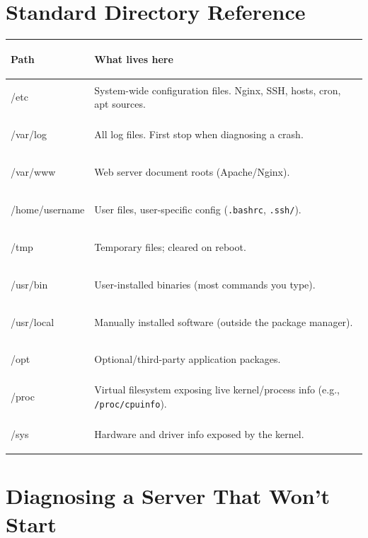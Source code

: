 \documentclass[11pt, letterpaper]{article}
\begin{document}
\section*{Standard Directory Reference}

\noindent
{\renewcommand{\arraystretch}{1.5}
\begin{tabularx}{\textwidth}{>{\ttfamily\bfseries\raggedright\arraybackslash}p{3.5cm}
                              >{\raggedright\arraybackslash}X}
\toprule
\rowcolor{tableheadergreen}
\textbf{Path} & \textbf{What lives here} \\
\midrule
\rowcolor{rowA}  /etc             & System-wide configuration files. Nginx, SSH, hosts, cron, apt sources. \\
\rowcolor{rowBg} /var/log         & All log files. First stop when diagnosing a crash. \\
\rowcolor{rowA}  /var/www         & Web server document roots (Apache/Nginx). \\
\rowcolor{rowBg} /home/username   & User files, user-specific config (\texttt{.bashrc}, \texttt{.ssh/}). \\
\rowcolor{rowA}  /tmp             & Temporary files; cleared on reboot. \\
\rowcolor{rowBg} /usr/bin         & User-installed binaries (most commands you type). \\
\rowcolor{rowA}  /usr/local       & Manually installed software (outside the package manager). \\
\rowcolor{rowBg} /opt             & Optional/third-party application packages. \\
\rowcolor{rowA}  /proc            & Virtual filesystem exposing live kernel/process info (e.g., \texttt{/proc/cpuinfo}). \\
\rowcolor{rowBg} /sys             & Hardware and driver info exposed by the kernel. \\
\bottomrule
\end{tabularx}}

\section*{Diagnosing a Server That Won't Start}
\end{document}
